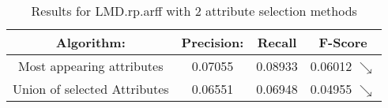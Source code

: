 \begin{table}[p]
\begin{center}
\begin{tabular}{|c|c|c|c|}
\hline Algorithm: & Precision: & Recall & F-Score\\
\hline Most appearing attributes & 0.07055 & 0.08933 & 0.06012 $\searrow$\\
\hline Union of selected Attributes & 0.06551 & 0.06948 & 0.04955 $\searrow$\\

\hline
\end{tabular}
\caption{Results for LMD.rp.arff with 2 attribute selection methods}
\label{table:classifier:LMD2}
\end{center}
\end{table}

